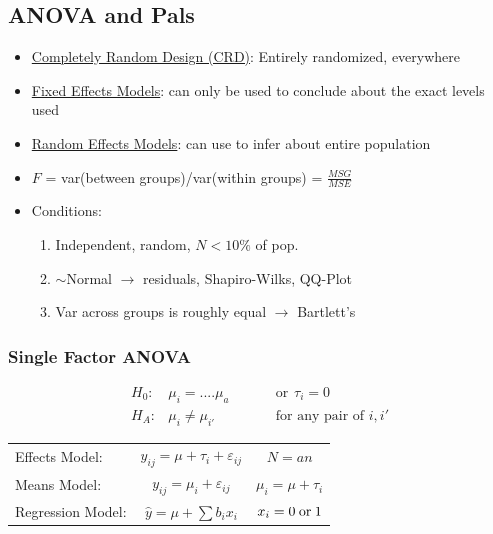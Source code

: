 \documentclass[twocolumn, 12pt]{article}    %
\begin{document}
\subsection*{ANOVA and Pals}
\begin{itemize}
    \item \underline{Completely Random Design (CRD)}: Entirely randomized, everywhere
    \item \underline{Fixed Effects Models}: can only be used to conclude about the exact levels used
    \item \underline{Random Effects Models}: can use to infer about entire population
    \item \(F\) = var(between groups)/var(within groups) = \(\frac{MSG}{MSE}\)
    \item Conditions:
        \begin{enumerate}
            \item Independent, random, \(N<10\%\) of pop.
            \item \(\sim\)Normal \(\longrightarrow\) residuals, Shapiro-Wilks, QQ-Plot
            \item Var across groups is roughly equal \(\longrightarrow\) Bartlett's
        \end{enumerate}
\end{itemize}
\subsubsection*{Single Factor ANOVA}
\begin{align*}
    H_0:& \mu_i=....\mu_a \hspace{30pt} &\text{or} \hspace{5pt} \tau_i =0\\
    H_A:& \mu_i \neq \mu_{i'}           &\text{for any pair of } i,i'
\end{align*}
\begin{table}[h!]
    \footnotesize
    \begin{tabular}{lcc}
        Effects Model: & \(y_{ij} = \mu + \tau_i + \varepsilon_{ij}\) & \(N=an\) \\
        Means Model: & \(y_{ij} = \mu_i + \varepsilon_{ij}\) & \(\mu_i = \mu +\tau_i\)\\
        Regression Model: &  \(\hat{y} = \mu + \sum b_ix_i\) & \(x_i = 0 \hspace{2.5pt} \text{or} \hspace{2.5pt} 1\)
    \end{tabular}
\end{table}
\end{document}
